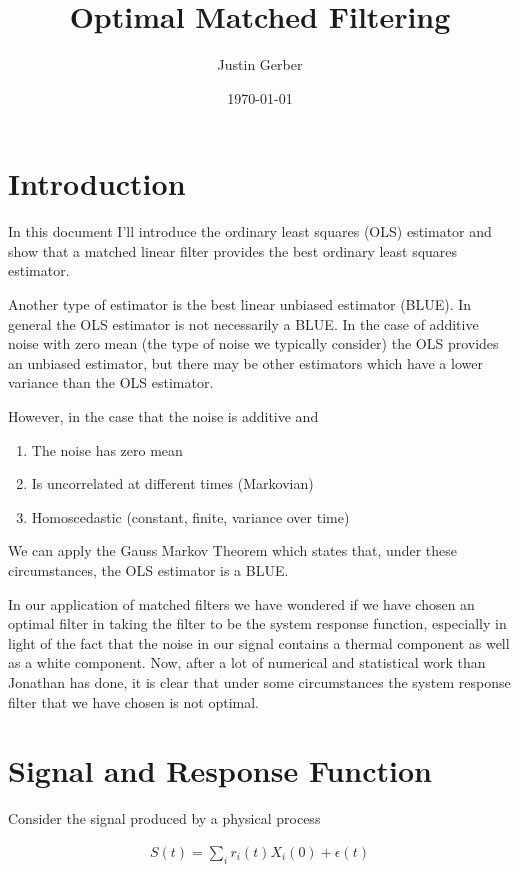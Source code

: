 \documentclass[12pt]{article}
\begin{document}
\title{Optimal Matched Filtering}
\author{Justin Gerber}
\date{\today}
\maketitle

\section{Introduction}

In this document I'll introduce the ordinary least squares (OLS) estimator and show that a matched linear filter provides the best ordinary least squares estimator.

Another type of estimator is the best linear unbiased estimator (BLUE). In general the OLS estimator is not necessarily a BLUE. In the case of additive noise with zero mean (the type of noise we typically consider) the OLS provides an unbiased estimator, but there may be other estimators which have a lower variance than the OLS estimator.

However, in the case that the noise is additive and 
\begin{enumerate}
\item The noise has zero mean
\item Is uncorrelated at different times (Markovian)
\item Homoscedastic (constant, finite, variance over time)	
\end{enumerate}

We can apply the Gauss Markov Theorem which states that, under these circumstances, the OLS estimator is a BLUE.

In our application of matched filters we have wondered if we have chosen an optimal filter in taking the filter to be the system response function, especially in light of the fact that the noise in our signal contains a thermal component as well as a white component. Now, after a lot of numerical and statistical work than Jonathan has done, it is clear that under some circumstances the system response filter that we have chosen is not optimal.

\section{Signal and Response Function}

Consider the signal produced by a physical process

\begin{align}
S(t) = \sum_{i} r_i(t) X_i(0) + \epsilon(t)
\end{align}
\end{document}
